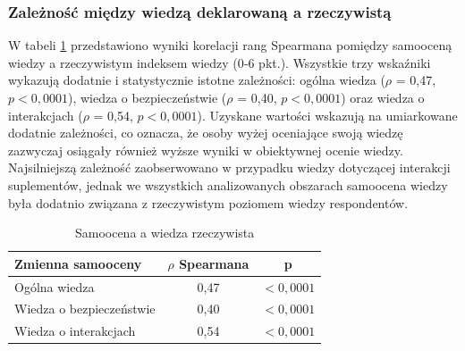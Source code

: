 \subsubsection{Zależność między wiedzą deklarowaną a rzeczywistą}

% 
% 
% 
% 

W tabeli \ref{tab:wiedza-dekl-rzecz} przedstawiono wyniki korelacji rang Spearmana pomiędzy samooceną wiedzy a rzeczywistym indeksem wiedzy (0‐6 pkt.). Wszystkie trzy wskaźniki wykazują dodatnie i statystycznie istotne zależności: ogólna wiedza ($\rho$ = 0,47, $p < 0,0001$), wiedza o bezpieczeństwie ($\rho$ = 0,40, $p < 0,0001$) oraz wiedza o interakcjach ($\rho$ = 0,54, $p < 0,0001$). Uzyskane wartości wskazują na umiarkowane dodatnie zależności, co oznacza, że osoby wyżej oceniające swoją wiedzę zazwyczaj osiągały również wyższe wyniki w obiektywnej ocenie wiedzy. Najsilniejszą zależność zaobserwowano w przypadku wiedzy dotyczącej interakcji suplementów, jednak we wszystkich analizowanych obszarach samoocena wiedzy była dodatnio związana z rzeczywistym poziomem wiedzy respondentów.

\begin{table}[H]
    \centering
    \caption{Samoocena a wiedza rzeczywista}
    \label{tab:wiedza-dekl-rzecz}
    \begin{tabular}{|l|c|c|}
        \hline
        \textbf{Zmienna samooceny} & \textbf{$\rho$ Spearmana} & \textbf{p} \\
        \hline
        \hline
        Ogólna wiedza & 0,47 & $< 0,0001$ \\
        \hline
        Wiedza o bezpieczeństwie & 0,40 & $< 0,0001$ \\
        \hline
        Wiedza o interakcjach & 0,54 & $< 0,0001$ \\
        \hline
    \end{tabular}
\end{table}


